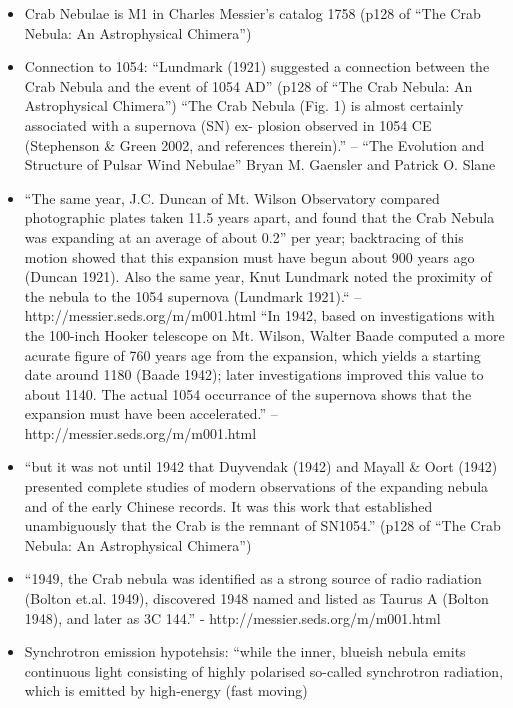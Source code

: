 \begin{itemize}
  \item Crab Nebulae is M1 in Charles Messier's catalog 1758 
    (p128 of ``The Crab Nebula: An Astrophysical Chimera'')
  \item Connection to 1054:
    ``Lundmark (1921) suggested a connection between the Crab Nebula and the event of 1054 AD''
    (p128 of ``The Crab Nebula: An Astrophysical Chimera'')
    ``The Crab Nebula (Fig. 1) is almost certainly associated with a
    supernova (SN) ex- plosion observed in 1054 CE (Stephenson \& Green
    2002, and references therein).'' -- ``The Evolution and Structure of Pulsar Wind Nebulae'' 
    Bryan M. Gaensler and Patrick O. Slane
  \item ``The same year, J.C. Duncan of Mt. Wilson Observatory compared
    photographic plates taken 11.5 years apart, and found that the
    Crab Nebula was expanding at an average of about 0.2'' per year;
    backtracing of this motion showed that this expansion must have
    begun about 900 years ago (Duncan 1921). Also the same year, Knut
    Lundmark noted the proximity of the nebula to the 1054 supernova
    (Lundmark 1921).`` -- http://messier.seds.org/m/m001.html
    ``In 1942, based on investigations with the 100-inch Hooker telescope
    on Mt. Wilson, Walter Baade computed a more acurate figure of 760
    years age from the expansion, which yields a starting date around
    1180 (Baade 1942); later investigations improved this value to about
    1140. The actual 1054 occurrance of the supernova shows that the
    expansion must have been accelerated.'' -- http://messier.seds.org/m/m001.html
  \item ``but it was not until 1942 that Duyvendak (1942) and Mayall \&
  Oort (1942) presented complete studies of modern observations of the
  expanding nebula and of the early Chinese records. It was this work
  that established unambiguously that the Crab is the remnant of SN1054.''
    (p128 of ``The Crab Nebula: An Astrophysical Chimera'')
  \item ``1949, the Crab nebula was identified as a strong source
  of radio radiation (Bolton et.al. 1949), discovered 1948 named
  and listed as Taurus A (Bolton 1948), and later as 3C 144.'' -
  http://messier.seds.org/m/m001.html
  \item Synchrotron emission hypotehsis: ``while the inner, blueish
      nebula emits continuous light consisting of highly polarised so-called
      synchrotron radiation, which is emitted by high-energy (fast moving)

\end{itemize}

